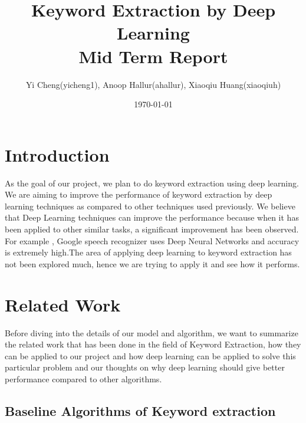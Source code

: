 \documentclass[dvips,9pt]{article}
\begin{document}
	
	
	\title{Keyword Extraction by Deep Learning \\Mid Term Report}
	\author{Yi Cheng(yicheng1), Anoop Hallur(ahallur), Xiaoqiu Huang(xiaoqiuh)}
	\date{\today}
	
	
	\maketitle
	
	
	\section{Introduction}
	
		As the goal of our project, we plan to do keyword extraction using deep learning. We are aiming to improve the performance of keyword extraction by deep learning techniques as compared to other techniques used previously.
		We believe that Deep Learning techniques can improve the performance because when it has been applied to other similar tasks, a significant improvement has been observed.
		For example , Google speech recognizer uses Deep Neural Networks and accuracy is extremely high\cite{hinton2012deep}.The area of applying deep learning to keyword extraction has not been explored much, hence we are trying to apply it and see how it performs.
	\section{Related Work}
	
		Before diving into the details of our model and algorithm, we want to summarize the related work that has been done in the field of Keyword Extraction, how they can be applied to our project and how deep learning can be applied to solve this particular problem and our thoughts on why deep learning should give better performance compared to other algorithms.
		
		\subsection{Baseline Algorithms of Keyword extraction}
		
\end{document}
